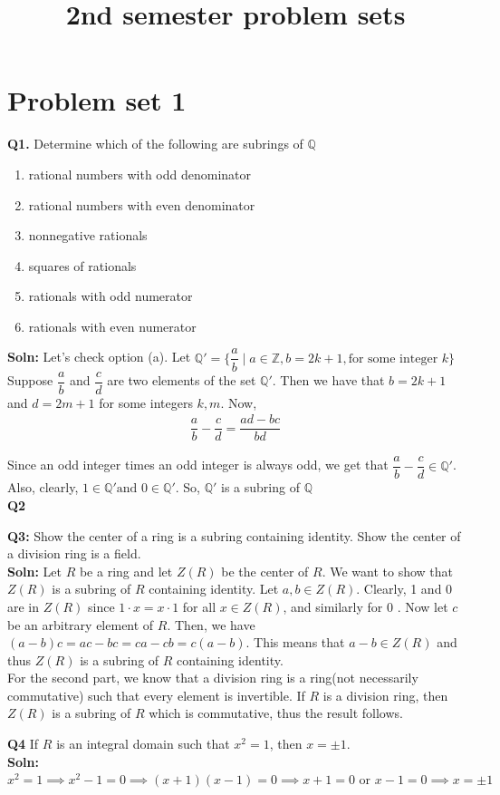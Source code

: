 \documentclass[12pt]{article}
\title{2nd semester problem sets}
\begin{document}
\maketitle
\section{Problem set 1}
\textbf{Q1.} Determine which of the following are subrings of $\mathbb{Q}$
\begin{enumerate}
    \item[a.] rational numbers with odd denominator
    \item[b.] rational numbers with even denominator
    \item[c.] nonnegative rationals
    \item[d.] squares of rationals
    \item[e.] rationals with odd numerator
    \item[f.] rationals with even numerator    
\end{enumerate}
\textbf{Soln: } Let's check option (a). Let $\mathbb{Q'}=\biggl\{\dfrac{a}{b}\mid a \in \mathbb{Z}, b=2k+1, \text{for some integer } k\biggr\}$ Suppose $\dfrac{a}{b}$ and $\dfrac{c}{d}$ are two elements of the set $\mathbb{Q'}$. Then we have that $b=2k+1$ and $d=2m+1$ for some integers $k,m$. Now, 
\begin{align*}
\dfrac{a}{b} - \dfrac{c}{d}= \dfrac{ad-bc}{bd}
\end{align*}

Since an odd integer times an odd integer is always odd, we get that $\dfrac{a}{b}-\dfrac{c}{d} \in \mathbb{Q'}$. Also, clearly, $1 \in \mathbb{Q'} \text{and } 0 \in \mathbb{Q'}$. So, $\mathbb{Q'}$ is a subring of $\mathbb{Q}$\\

\textbf{Q2}

\textbf{Q3: } Show the center of a ring is a subring containing identity. Show the center of a division
ring is a field.\\

\textbf{Soln: } Let $R$ be a ring and let $Z(R)$ be the center of $R$. We want to show that $Z(R)$ is a subring of $R$ containing identity. Let $a,b \in Z(R)$. Clearly, 1 and 0 are in $Z(R)$ since $1\cdot x=x\cdot 1$ for all $x \in Z(R)$, and similarly for 0 . Now let $c$ be an arbitrary element of $R$. Then, we have $(a-b)c=ac-bc=ca-cb=c(a-b)$. This means that $a-b \in Z(R)$ and thus $Z(R)$ is a subring of $R$ containing identity. \\

For the second part, we know that a division ring is a ring(not necessarily commutative) such that every element is invertible. If $R$ is a division ring, then $Z(R)$ is a subring of $R$ which is commutative, thus the result follows.

\textbf{Q4} If $R$ is an integral domain such that $x^2=1$, then $x=\pm1$.\\

\textbf{Soln: } $x^2=1\implies x^2-1=0\implies (x+1)(x-1)=0\implies x+1=0 \text{ or } x-1=0 \implies x=\pm 1$
\end{document}
